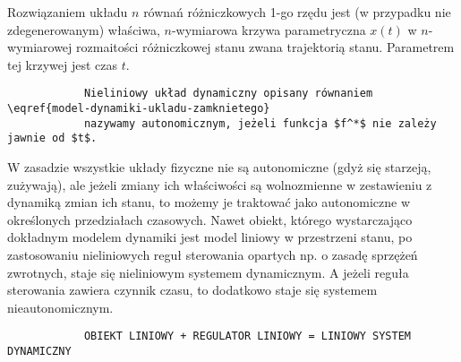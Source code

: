 \documentclass{article}
\begin{document}
		Rozwiązaniem układu $n$ równań różniczkowych 1-go rzędu jest (w przypadku nie
		zdegenerowanym) właściwa, $n$-wymiarowa krzywa parametryczna $x(t)$ w $n$-wymiarowej
		rozmaitości różniczkowej stanu zwana trajektorią stanu. Parametrem tej krzywej jest czas $t$.
		
		\begin{verbatim}
			Nieliniowy układ dynamiczny opisany równaniem \eqref{model-dynamiki-ukladu-zamknietego}
			nazywamy autonomicznym, jeżeli funkcja $f^*$ nie zależy jawnie od $t$.
		\end{verbatim}

		W zasadzie wszystkie układy fizyczne nie są autonomiczne (gdyż się starzeją, zużywają), ale
		jeżeli zmiany ich właściwości są wolnozmienne w zestawieniu z dynamiką zmian ich stanu, to
		możemy je traktować jako autonomiczne w określonych przedziałach czasowych.
		Nawet obiekt, którego wystarczająco dokładnym modelem dynamiki jest model liniowy w
		przestrzeni stanu, po zastosowaniu nieliniowych reguł sterowania opartych np. o zasadę
		sprzężeń zwrotnych, staje się nieliniowym systemem dynamicznym. A jeżeli reguła
		sterowania zawiera czynnik czasu, to dodatkowo staje się systemem nieautonomicznym.
		\begin{verbatim}
			OBIEKT LINIOWY + REGULATOR LINIOWY = LINIOWY SYSTEM DYNAMICZNY
		\end{verbatim}
\end{document}
